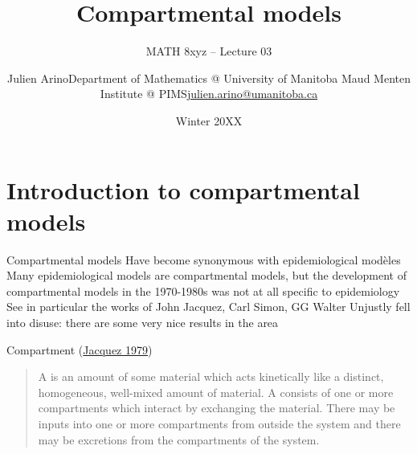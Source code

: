 \documentclass[aspectratio=169]{beamer}\usepackage[]{graphicx}\usepackage[]{xcolor}
\subtitle{MATH 8xyz -- Lecture 03}
\author{\texorpdfstring{Julien Arino\newline Department of Mathematics @ University of Manitoba \newline Maud Menten Institute @ PIMS\newline\url{julien.arino@umanitoba.ca}}{Julien Arino}}
\date{Winter 20XX}
\title{Compartmental models}
\begin{document}

\section{Introduction to compartmental models}


\begin{frame}{Compartmental models}
\bbullet Have become synonymous with epidemiological modèles
\vfill
\bbullet Many epidemiological models are compartmental models, but the development of compartmental models in the 1970-1980s was not at all specific to epidemiology
\vfill
\bbullet See in particular the works of John Jacquez, Carl Simon, GG Walter
\vfill
\bbullet Unjustly fell into disuse: there are some very nice results in the area    
\end{frame}

\begin{frame}{Compartment (\href{https://doi-org.uml.idm.oclc.org/10.1016/B978-0-12-434180-7.50021-8}{Jacquez 1979})}

\begin{quote}
  A  is an amount of some material which acts kinetically like a distinct, homogeneous, well-mixed amount of material. A  consists of one or more compartments which interact by exchanging the material. There may be inputs into one or more compartments from outside the system and there may be excretions from the compartments of the system.   
\end{quote}
\end{frame}
\end{document}
